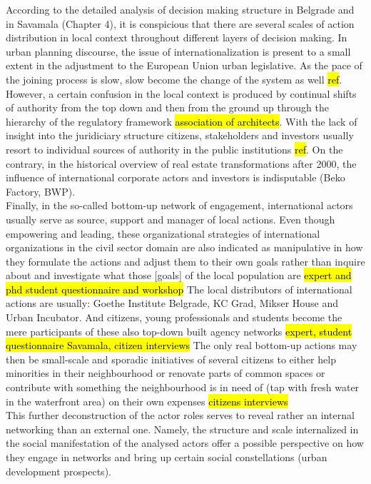 \documentclass[11pt]{report}
\begin{document}
According to the detailed analysis of decision making structure in Belgrade and in Savamala (Chapter 4), it is conspicious that there are several scales of action distribution in local context throughout different layers of decision making.
In urban planning discourse, the issue of internationalization is present to a small extent in the adjustment to the European Union urban legislative. As the pace of the joining process is slow, slow become the change of the system as well \hl{ref}. 
However, a certain confusion in the local context is produced by continual shifts of authority from  the top down and then from the ground up through the hierarchy of the regulatory framework \hl{association of architects}. With the lack of insight into the juridiciary structure citizens, stakeholders and investors usually resort to individual sources of authority in the public institutions \hl{ref}.
On the contrary, in the historical overview of real estate transformations after 2000, the influence of international corporate actors and investors is indisputable (Beko Factory, BWP).
\\
Finally, in the so-called bottom-up network of engagement, international actors usually serve as source, support and manager of local actions. Even though empowering and leading, these organizational strategies of international organizations in the civil sector domain are also indicated as manipulative in how they formulate the actions and adjust them to their own goals rather than inquire about and investigate what those [goals] of the local  population are \hl{expert and phd student questionnaire and workshop}
The local distributors of international actions are usually: Goethe Institute Belgrade, KC Grad, Mikser House and Urban Incubator. And citizens, young professionals and students become the mere participants  of these also top-down built agency networks \hl{expert, student questionnaire Savamala, citizen interviews}
The only real bottom-up actions may then be small-scale and sporadic initiatives of several citizens to either help minorities in their neighbourhood or renovate parts of common spaces or contribute with something the neighbourhood is in need of (tap with fresh water in the waterfront area) on their own expenses \hl{citizens interviews}
\\
This further deconstruction of the actor roles serves to reveal rather an internal networking than an external one. Namely, the structure and scale internalized in the social manifestation of the analysed actors offer a possible perspective on how they engage in networks and bring up certain social constellations (urban development prospects).
\end{document}
